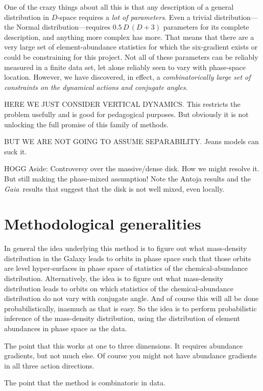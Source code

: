 \documentclass[modern]{aastex63}
\newcommand{\gaia}{\textsl{Gaia}}
\begin{document}
One of the crazy things about all this is that any description of a general distribution in $D$-space
requires a \emph{lot of parameters}.
Even a trivial distribution---the Normal distribution---requires $0.5\,D\,(D+3)$ parameters for its
complete description, and anything more complex has more.
That means that there are a very large set of element-abundance statistics for which the
six-gradient exists or could be constraining for this project.
Not all of these parameters can be reliably measured in a finite data set,
let alone reliably seen to vary with phase-space location.
However,
we have discovered, in effect, a \emph{combinatorically large set of constraints on the
dynamical actions and conjugate angles}.

HERE WE JUST CONSIDER VERTICAL DYNAMICS.
This restricts the problem usefully and is good for pedagogical purposes.
But obviously it is not unlocking the full promise of this family of methods.

BUT WE ARE NOT GOING TO ASSUME SEPARABILITY.
Jeans models can suck it.

HOGG Aside: Controversy over the massive/dense disk. How we might resolve it.
But still making the phase-mixed assumption! Note the Antoja results and the \gaia\ results
that suggest that the disk is not well mixed, even locally.

\section{Methodological generalities}

In general the idea underlying this method is to figure out what mass-density distribution
in the Galaxy leads to orbits in phase space such that those orbits are level
hyper-surfaces in phase space of statistics of the chemical-abundance distribution.
Alternatively, the idea is to figure out what mass-density distribution leads to orbits
on which statistics of the chemical-abundance distribution do not vary with conjugate
angle.
And of course this will all be done probabilistically, inasmuch as that is easy.
So the idea is to perform probabilistic inference of the mass-density distribution, using
the distribution of element abundances in phase space as the data.

The point that this works at one to three dimensions. It requires abundance gradients, but
not much else. Of course you might not have abundance gradients in all three action directions.

The point that the method is combinatoric in data.
\end{document}

